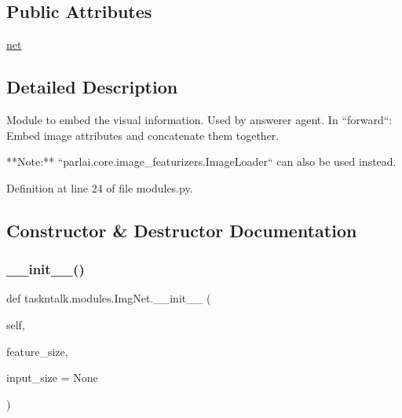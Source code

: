 \subsection*{Public Attributes}
\begin{DoxyCompactItemize}
\item 
\hyperlink{classtaskntalk_1_1modules_1_1ImgNet_a63c85b15e7d87f6c08e790c7cbeb4ef7}{net}
\end{DoxyCompactItemize}


\subsection{Detailed Description}
\begin{DoxyVerb}Module to embed the visual information. Used by answerer agent.
In ``forward``: Embed image attributes and concatenate them together.

**Note:** ``parlai.core.image_featurizers.ImageLoader`` can also be
used instead.
\end{DoxyVerb}
 

Definition at line 24 of file modules.\+py.



\subsection{Constructor \& Destructor Documentation}
\mbox{\label{classtaskntalk_1_1modules_1_1ImgNet_a386437633b44ce30146aa46a7c992b30}} 
\subsubsection{\texorpdfstring{\+\_\+\+\_\+init\+\_\+\+\_\+()}{\_\_init\_\_()}}
{\footnotesize\ttfamily def taskntalk.\+modules.\+Img\+Net.\+\_\+\+\_\+init\+\_\+\+\_\+ (\begin{DoxyParamCaption}\item[{}]{self,  }\item[{}]{feature\+\_\+size,  }\item[{}]{input\+\_\+size = {\ttfamily None} }\end{DoxyParamCaption})}



